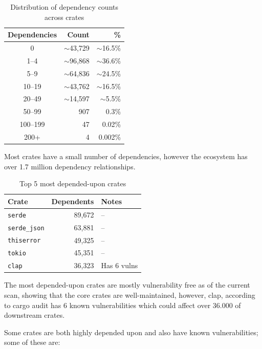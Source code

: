 \begin{table}[ht]
\centering
\begin{tabular}{|c|r|r|}
\hline
\textbf{Dependencies} & \textbf{Count} & \textbf{\%} \\
\hline
0 & $\sim$43{,}729 & $\sim$16.5\% \\
\hline
1--4 & $\sim$96{,}868 & $\sim$36.6\% \\
\hline
5--9 & $\sim$64{,}836 & $\sim$24.5\% \\
\hline
10--19 & $\sim$43{,}762 & $\sim$16.5\% \\
\hline
20--49 & $\sim$14{,}597 & $\sim$5.5\% \\
\hline
50--99 & 907 & 0.3\% \\
\hline
100--199 & 47 & 0.02\% \\
\hline
200+ & 4 & 0.002\% \\
\hline
\end{tabular}
\caption{Distribution of dependency counts across crates}
\label{tab:dependency-distribution}
\end{table}

Most crates have a small number of dependencies, however the ecosystem has over 1.7 million dependency relationships.

\begin{table}[ht]
\centering
\begin{tabular}{|l|r|l|}
\hline
\textbf{Crate} & \textbf{Dependents} & \textbf{Notes} \\
\hline
\texttt{serde} & 89{,}672 & -- \\
\hline
\texttt{serde\_json} & 63{,}881 & -- \\
\hline
\texttt{thiserror} & 49{,}325 & -- \\
\hline
\texttt{tokio} & 45{,}351 & -- \\
\hline
\texttt{clap} & 36{,}323 & Has 6 vulns \\
\hline
\end{tabular}
\caption{Top 5 most depended-upon crates}
\label{tab:top-dependent-crates}
\end{table}

The most depended-upon crates are mostly vulnerability free as of the current scan, showing that the core crates are well-maintained, however, clap, according to cargo audit has 6 known vulnerabilities which could affect over 36.000 of downstream crates.

Some crates are both highly depended upon and also have known vulnerabilities; some of these are:

